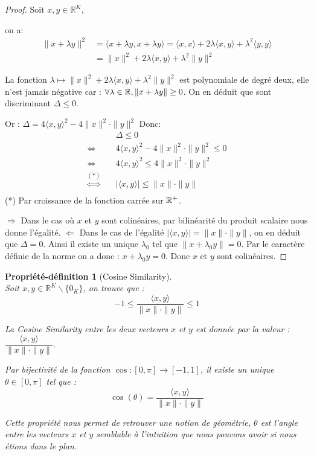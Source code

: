 \documentclass[12pt]{article}
\newtheorem{prop-def}{Propriété-définition}
\theoremstyle{definition}
\begin{document}
\begin{proof}
	Soit $x, y \in \mathbb{R}^K$,
	
	on a: 
	\begin{align*}
		\|x+\lambda y\|^2 &= \langle x+\lambda y, x+\lambda y \rangle = \langle x, x\rangle + 2\lambda\langle x, y \rangle + \lambda^2\langle y,y \rangle\\
		&= \|x\|^2 + 2\lambda\langle x, y \rangle + \lambda^2\|y\|^2
	\end{align*}

La fonction $\lambda \mapsto \|x\|^2 + 2\lambda\langle x, y \rangle + \lambda^2\|y\|^2$ est polynomiale de degré deux, elle n'est jamais négative car : $\forall \lambda \in \mathbb{R} , \|x+\lambda y\|\geq 0 $. On en déduit que sont discriminant $\Delta\leq 0$.

Or : $\Delta = 4\langle x, y \rangle^2 -4\|x\|^2\cdot\|y\|^2 $ 
Donc: 
	\begin{align*}
		&\quad \Delta\leq 0\\
		\Leftrightarrow&\quad 4\langle x, y \rangle^2 -4\|x\|^2\cdot\|y\|^2 \leq 0\\
		\Leftrightarrow&\quad 4\langle x, y \rangle^2 \leq 4\|x\|^2\cdot\|y\|^2\\
		\overset{(*)}{\Leftrightarrow}&\quad |\langle x, y \rangle| \leq \|x\|\cdot\|y\|\\
	\end{align*}
(*) Par croissance de la fonction carrée sur $\mathbb{R}^+$. 

$\Rightarrow$ Dans le cas où $x$ et $y$ sont colinéaires, par bilinéarité du produit scalaire nous donne l'égalité. 
$\Leftarrow$ Dans le cas de l'égalité $|\langle x, y \rangle| = \|x\|\cdot\|y\|$, on en déduit que $\Delta = 0$. Ainsi il existe un unique $\lambda_0$ tel que $\|x+\lambda_0 y\| = 0$. Par le caractère définie de la norme on a donc : $x+\lambda_0 y = 0 $. Donc $x$ et $y$ sont colinéaires.
\end{proof}

\begin{prop-def}[Cosine Similarity]\hfill\\
	Soit $x, y \in \mathbb{R}^K\backslash\{0_K\}$, on trouve que :
	$$-1  \leq \dfrac{\langle x, y \rangle}{\|x\| \cdot\|y\|} \leq 1$$
	
	La Cosine Similarity entre les deux vecteurs $x$ et $y$ est donnée par la valeur : $\dfrac{\langle x, y \rangle}{\|x\| \cdot\|y\|}$.
	
	Par bijectivité de la fonction $\cos : [0,\pi] \to [-1,1]$, il existe un unique $\theta \in [0,\pi]$ tel que : $$\cos(\theta) = \dfrac{\langle x, y \rangle}{\|x\| \cdot\|y\|} $$
	
	Cette propriété nous permet de retrouver une notion de géométrie, $\theta$ est l'angle entre les vecteurs $x$ et $y$ semblable à l'intuition que nous pouvons avoir si nous étions dans le plan. \\
\end{prop-def}
\end{document}
